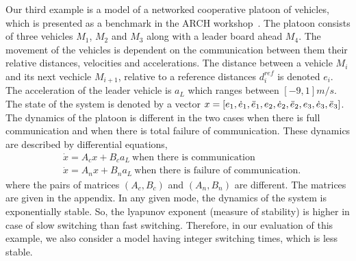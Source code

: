 Our third example is a model of a networked cooperative platoon of
vehicles, which is presented as a benchmark in the ARCH
workshop~\cite{makhlouf2014networked}.  The platoon consists of three
vehicles $M_1$, $M_2$ and $M_3$ along with a leader board ahead $M_4$.
The movement of the vehicles is dependent on the communication between
them their relative distances, velocities and accelerations.  The
distance between a vehicle $M_i$ and its next
vechicle $M_{i+1}$, relative to a reference distances $d_i^{ref}$ is
denoted $e_i$.  The acceleration of the leader vehicle is $a_L$ which
ranges between $[-9,1]m/s$.  The state of the system is denoted
by a vector
$x=\left[e_1,\dot{e}_1,\ddot{e}_1,e_2,\dot{e}_2,\ddot{e}_2,e_3,\dot{e}_3,\ddot{e}_3\right]$.
The dynamics of the platoon is different in the two cases when there
is full communication and when there is total failure of
communication.  These dynamics are described by differential equations,
%
\begin{align*}
& \dot{x}=A_cx+B_ca_L~\text{when there is communication}\\
& \dot{x}=A_nx+B_na_L~\text{when there is failure of communication}.
\end{align*}
%
where the pairs of matrices $(A_c,B_c)$ and $(A_n,B_n)$ are different.
The matrices are given in the appendix.  In any given mode, the
dynamics of the system is exponentially stable.  So, the lyapunov
exponent (measure of stability) is higher in case of slow switching
than fast switching.  Therefore, in our evaluation of this example, we
also consider a model having integer switching times, which is less
stable.

